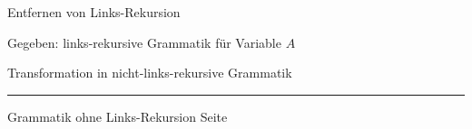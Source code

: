 \documentclass{slides}
\newcounter{mypage}
\begin{document}

\begin{slide}{}
\normalsize
\begin{center}
Entfernen von Links-Rekursion
\end{center}
\vspace{1.5cm}

\footnotesize

Gegeben: links-rekursive Grammatik f\"ur Variable $A$
\begin{center}
\end{center}

Transformation in nicht-links-rekursive Grammatik
\begin{center}
\end{center}

\vspace*{\fill}
\tiny \addtocounter{mypage}{1}
\rule{17cm}{1mm}
Grammatik  ohne Links-Rekursion \hspace*{\fill} Seite 
\end{slide}

\end{document}
